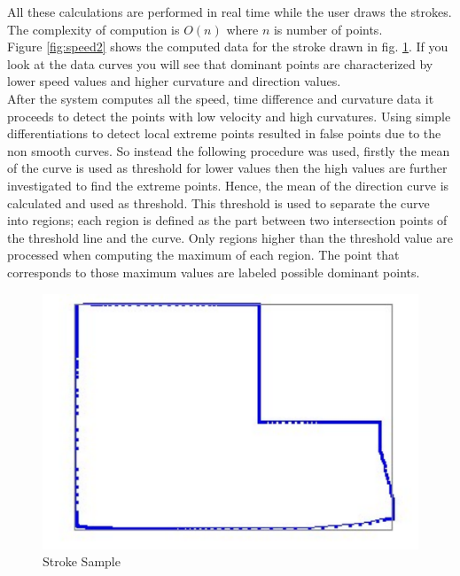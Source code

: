 \documentclass[a4paper,10pt]{IEEEconf}
\begin{document}
 All these calculations are performed in real time while the user draws the strokes.
 The complexity of compution is $O(n)$ where $n$ is number of points. \\
 Figure \ref{fig:speed2} shows the computed data for the stroke drawn in fig. \ref{fig:orignalStroke}.  If you look at the data curves you will see that dominant points are characterized by lower speed values and higher curvature and direction values. \\%
After the system computes all the speed, time difference and curvature data it proceeds to detect the points with low velocity and high curvatures. Using simple differentiations to detect local extreme points resulted in false points due to the non smooth curves. So instead the following procedure was used, firstly the mean of the curve is used as threshold for lower values then the high values are further investigated to find the extreme points. Hence, the mean of the direction curve is calculated and used as threshold. This threshold is used to separate the curve into regions; each region is defined as the part between two intersection points of the threshold line and the curve. Only regions higher than the threshold value are processed when computing the maximum of each region. The point that corresponds to those maximum values are labeled possible dominant points.   \\
\begin{figure}[]
	\centering
		\includegraphics[scale=0.3]{images/orignalStroke.pdf}
	\caption{Stroke Sample}
	\label{fig:orignalStroke}
\end{figure}
\end{document}

